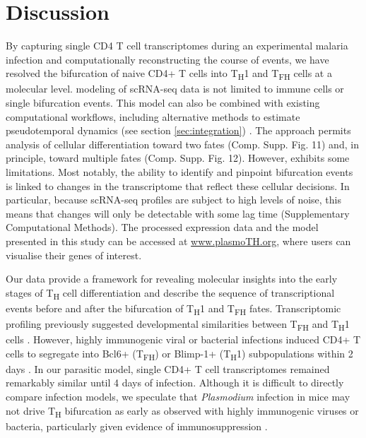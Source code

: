 \section{Discussion}

By capturing single CD4 T cell transcriptomes during an experimental malaria infection and computationally reconstructing the course of events, we have resolved the bifurcation of naive CD4+ T cells into T\textsubscript{H}1 and T\textsubscript{FH} cells at a molecular level.  modeling of scRNA-seq data is not limited to immune cells or single bifurcation events. This model can also be combined with existing computational workflows, including alternative methods to estimate pseudotemporal dynamics (see section \ref{sec:integration}) \cite{Trapnell2014-cn, Bendall2014-kg}. The  approach permits analysis of cellular differentiation toward two fates (Comp. Supp. Fig. 11) and, in principle, toward multiple fates (Comp. Supp. Fig. 12). However,  exhibits some limitations. Most notably, the ability to identify and pinpoint bifurcation events is linked to changes in the transcriptome that reflect these cellular decisions. In particular, because scRNA-seq profiles are subject to high levels of noise, this means that changes will only be detectable with some lag time (Supplementary Computational Methods). The processed expression data and the  model presented in this study can be accessed at \url{www.plasmoTH.org}, where users can visualise their genes of interest.

Our data provide a framework for revealing molecular insights into the early stages of T\textsubscript{H} cell differentiation and describe the sequence of transcriptional events before and after the bifurcation of T\textsubscript{H}1 and T\textsubscript{FH} fates. Transcriptomic profiling previously suggested developmental similarities between T\textsubscript{FH} and T\textsubscript{H}1 cells \cite{Liu2012-vw}. However, highly immunogenic viral or bacterial infections induced CD4+ T cells to segregate into Bcl6+ (T\textsubscript{FH}) or Blimp-1+ (T\textsubscript{H}1) subpopulations within 2 days \cite{Choi2011-ym, Pepper2011-mm}. In our parasitic model, single CD4+ T cell transcriptomes remained remarkably similar until 4 days of infection. Although it is difficult to directly compare infection models, we speculate that \textit{Plasmodium} infection in mice may not drive T\textsubscript{H} bifurcation as early as observed with highly immunogenic viruses or bacteria, particularly given evidence of immunosuppression \cite{Haque2014-sq}.

